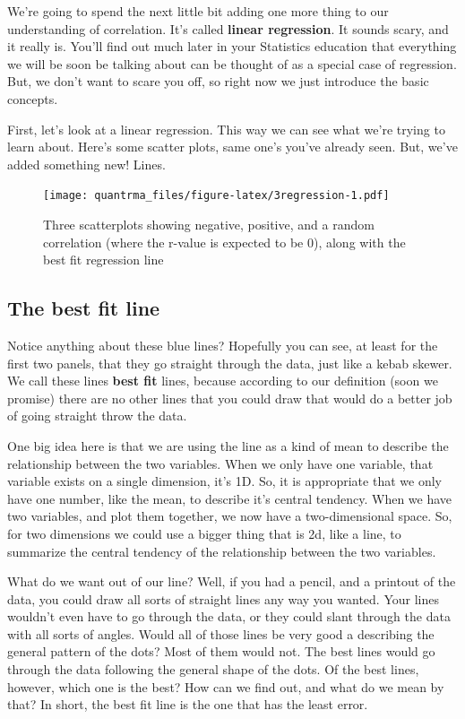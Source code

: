 \documentclass[
]{book}
\begin{document}
We're going to spend the next little bit adding one more thing to our understanding of correlation. It's called \textbf{linear regression}. It sounds scary, and it really is. You'll find out much later in your Statistics education that everything we will be soon be talking about can be thought of as a special case of regression. But, we don't want to scare you off, so right now we just introduce the basic concepts.

First, let's look at a linear regression. This way we can see what we're trying to learn about. Here's some scatter plots, same one's you've already seen. But, we've added something new! Lines.

\begin{figure}
\centering
\texttt{[image: quantrma\_files/figure-latex/3regression-1.pdf]}
\caption{\label{fig:3regression}Three scatterplots showing negative, positive, and a random correlation (where the r-value is expected to be 0), along with the best fit regression line}
\end{figure}

\hypertarget{the-best-fit-line}{%
\subsection{The best fit line}\label{the-best-fit-line}}

Notice anything about these blue lines? Hopefully you can see, at least for the first two panels, that they go straight through the data, just like a kebab skewer. We call these lines \textbf{best fit} lines, because according to our definition (soon we promise) there are no other lines that you could draw that would do a better job of going straight throw the data.

One big idea here is that we are using the line as a kind of mean to describe the relationship between the two variables. When we only have one variable, that variable exists on a single dimension, it's 1D. So, it is appropriate that we only have one number, like the mean, to describe it's central tendency. When we have two variables, and plot them together, we now have a two-dimensional space. So, for two dimensions we could use a bigger thing that is 2d, like a line, to summarize the central tendency of the relationship between the two variables.

What do we want out of our line? Well, if you had a pencil, and a printout of the data, you could draw all sorts of straight lines any way you wanted. Your lines wouldn't even have to go through the data, or they could slant through the data with all sorts of angles. Would all of those lines be very good a describing the general pattern of the dots? Most of them would not. The best lines would go through the data following the general shape of the dots. Of the best lines, however, which one is the best? How can we find out, and what do we mean by that? In short, the best fit line is the one that has the least error.
\end{document}
